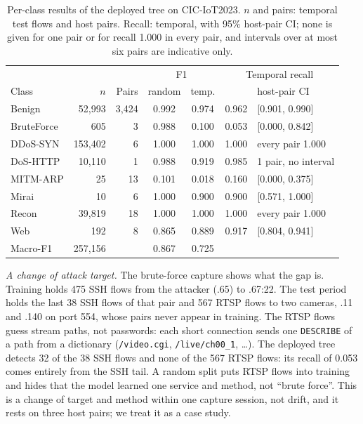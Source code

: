 \begin{table}[t]
\centering
\caption{Per-class results of the deployed tree on CIC-IoT2023. $n$ and pairs: temporal test flows and host pairs. Recall: temporal, with 95\% host-pair CI; none is given for one pair or for recall 1.000 in every pair, and intervals over at most six pairs are indicative only.}
\label{tab:perclass}
\footnotesize
\setlength{\tabcolsep}{3pt}
\begin{tabular}{lrrcccl}
\hline
 & & & \multicolumn{2}{c}{F1} & \multicolumn{2}{c}{Temporal recall} \\
Class & $n$ & Pairs & random & temp. & & host-pair CI \\
\hline
Benign     &  52,993 & 3,424 & 0.992 & 0.974 & 0.962 & [0.901, 0.990] \\
BruteForce &     605 &     3 & 0.988 & 0.100 & 0.053 & [0.000, 0.842] \\
DDoS-SYN   & 153,402 &     6 & 1.000 & 1.000 & 1.000 & every pair 1.000 \\
DoS-HTTP   &  10,110 &     1 & 0.988 & 0.919 & 0.985 & 1 pair, no interval \\
MITM-ARP   &      25 &    13 & 0.101 & 0.018 & 0.160 & [0.000, 0.375] \\
Mirai      &      10 &     6 & 1.000 & 0.900 & 0.900 & [0.571, 1.000] \\
Recon      &  39,819 &    18 & 1.000 & 1.000 & 1.000 & every pair 1.000 \\
Web        &     192 &     8 & 0.865 & 0.889 & 0.917 & [0.804, 0.941] \\
\hline
Macro-F1   & 257,156 &       & 0.867 & 0.725 & & \\
\hline
\end{tabular}
\end{table}

\emph{A change of attack target.} The brute-force capture shows what the gap is. Training holds 475 SSH flows from the attacker (.65) to .67:22. The test period holds the last 38 SSH flows of that pair and 567 RTSP flows to two cameras, .11 and .140 on port 554, whose pairs never appear in training. The RTSP flows guess stream paths, not passwords: each short connection sends one \texttt{DESCRIBE} of a path from a dictionary (\texttt{/video.cgi}, \texttt{/live/ch00\_1}, \ldots). The deployed tree detects 32 of the 38 SSH flows and none of the 567 RTSP flows: its recall of 0.053 comes entirely from the SSH tail. A random split puts RTSP flows into training and hides that the model learned one service and method, not ``brute force''. This is a change of target and method within one capture session, not drift, and it rests on three host pairs; we treat it as a case study.

